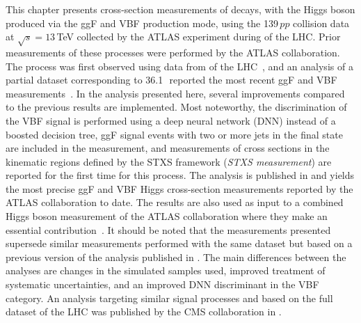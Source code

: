 This chapter presents cross-section measurements of \HWWdet decays, with the Higgs boson produced via the ggF and VBF production mode, using the 139\,\ifb $pp$ collision data at $\sqrt{s} = 13\,$TeV collected by the ATLAS experiment during \RunTwo of the LHC. 
Prior measurements of these processes were performed by the ATLAS collaboration.
The \HWW process was first observed using data from \RunOne of the LHC~\cite{HIGG-2013-13}, and an analysis of a partial \RunTwo dataset corresponding to 36.1\,\ifb\ reported the most recent ggF and VBF \HWW measurements~\cite{HIGG-2013-13}.
In the analysis presented here, several improvements compared to the previous \RunTwo results are implemented. Most noteworthy, the discrimination of the VBF signal is performed using a deep neural network (DNN) instead of a boosted decision tree, ggF signal events with two or more jets in the final state are included in the measurement, and measurements of cross sections in the kinematic regions defined by the STXS framework (\emph{STXS measurement}) are reported for the first time for this process.
The analysis is published in  and yields the most precise ggF and VBF Higgs cross-section measurements reported by the ATLAS collaboration to date.
The results are also used as input to a combined Higgs boson measurement of the ATLAS collaboration where they make an essential contribution~\cite{NaturePaper}.
It should be noted that the measurements presented supersede similar measurements performed with the same dataset but based on a previous version of the analysis published in .
The main differences between the analyses are changes in the simulated samples used, improved treatment of systematic uncertainties, and an improved DNN discriminant in the VBF category. 
An analysis targeting similar signal processes and based on the full \RunTwo dataset of the LHC was published by the CMS collaboration in . 

